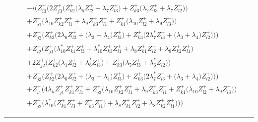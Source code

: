 \begin{align} 
 &-i \Big(Z_{{i 3}}^{+} \Big(2 Z_{{j 3}}^{+} \Big(Z_{{k 2}}^{+} \Big(\lambda_5 Z_{{l 2}}^{+}  + \lambda_7 Z_{{l 3}}^{+} \Big) + Z_{{k 3}}^{+} \Big(\lambda_2 Z_{{l 3}}^{+}  + \lambda_7 Z_{{l 2}}^{+} \Big)\Big)\nonumber \\ 
 &+Z_{{j 1}}^{+} \Big(\lambda_10 Z_{{k 2}}^{+} Z_{{l 1}}^{+}  + \lambda_9 Z_{{k 3}}^{+} Z_{{l 1}}^{+}  + Z_{{k 1}}^{+} \Big(\lambda_10 Z_{{l 2}}^{+}  + \lambda_9 Z_{{l 3}}^{+} \Big)\Big)\nonumber \\ 
 &+Z_{{j 2}}^{+} \Big(Z_{{k 2}}^{+} \Big(2 \lambda_6 Z_{{l 2}}^{+}  + \Big(\lambda_3 + \lambda_4\Big)Z_{{l 3}}^{+} \Big) + Z_{{k 3}}^{+} \Big(2 \lambda_7^* Z_{{l 3}}^{+}  + \Big(\lambda_3 + \lambda_4\Big)Z_{{l 2}}^{+} \Big)\Big)\Big)\nonumber \\ 
 &+Z_{{i 2}}^{+} \Big(Z_{{j 1}}^{+} \Big(\lambda_10^* Z_{{k 1}}^{+} Z_{{l 3}}^{+}  + \lambda_10^* Z_{{k 3}}^{+} Z_{{l 1}}^{+}  + \lambda_8 Z_{{k 1}}^{+} Z_{{l 2}}^{+}  + \lambda_8 Z_{{k 2}}^{+} Z_{{l 1}}^{+} \Big)\nonumber \\ 
 &+2 Z_{{j 2}}^{+} \Big(Z_{{k 2}}^{+} \Big(\lambda_1 Z_{{l 2}}^{+}  + \lambda_6^* Z_{{l 3}}^{+} \Big) + Z_{{k 3}}^{+} \Big(\lambda_5 Z_{{l 3}}^{+}  + \lambda_6^* Z_{{l 2}}^{+} \Big)\Big)\nonumber \\ 
 &+Z_{{j 3}}^{+} \Big(Z_{{k 2}}^{+} \Big(2 \lambda_6 Z_{{l 2}}^{+}  + \Big(\lambda_3 + \lambda_4\Big)Z_{{l 3}}^{+} \Big) + Z_{{k 3}}^{+} \Big(2 \lambda_7^* Z_{{l 3}}^{+}  + \Big(\lambda_3 + \lambda_4\Big)Z_{{l 2}}^{+} \Big)\Big)\Big)\nonumber \\ 
 &+Z_{{i 1}}^{+} \Big(4 \lambda_h Z_{{j 1}}^{+} Z_{{k 1}}^{+} Z_{{l 1}}^{+} +Z_{{j 3}}^{+} \Big(\lambda_10 Z_{{k 2}}^{+} Z_{{l 1}}^{+}  + \lambda_9 Z_{{k 3}}^{+} Z_{{l 1}}^{+}  + Z_{{k 1}}^{+} \Big(\lambda_10 Z_{{l 2}}^{+}  + \lambda_9 Z_{{l 3}}^{+} \Big)\Big)\nonumber \\ 
 &+Z_{{j 2}}^{+} \Big(\lambda_10^* \Big(Z_{{k 1}}^{+} Z_{{l 3}}^{+}  + Z_{{k 3}}^{+} Z_{{l 1}}^{+} \Big) + \lambda_8 Z_{{k 1}}^{+} Z_{{l 2}}^{+}  + \lambda_8 Z_{{k 2}}^{+} Z_{{l 1}}^{+} \Big)\Big)\Big)\end{align} 
\hrule 

